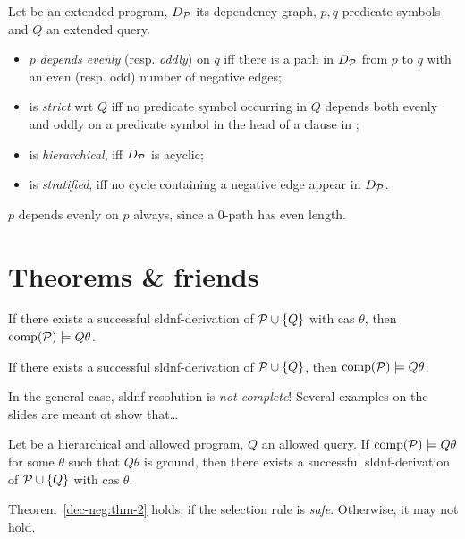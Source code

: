 \begin{dfn}
    Let \prog be an extended program, \(D_\mathcal{P}\) its dependency graph, \(p,q\) predicate symbols and \(Q\) an extended query.
    \begin{itemize}
        \item \(p\) \emph{depends evenly} (resp. \emph{oddly}) on \(q\) iff there is a path in \(D_\mathcal{P}\) from \(p\) to \(q\) with an even (resp. odd) number of negative edges;
        \item \prog is \emph{strict} wrt \(Q\) iff no predicate symbol occurring in \(Q\) depends both evenly and oddly on a predicate symbol in the head of a clause in \prog;
        \item \prog is \emph{hierarchical}, iff \(D_\mathcal{P}\) is acyclic;
        \item \prog is \emph{stratified}, iff no cycle containing a negative edge appear in \(D_\mathcal{P}\).
    \end{itemize}
\end{dfn}

\begin{rem}
    \(p\) depends evenly on \(p\) always, since a \(0\)-path has even length.
\end{rem}

\section{Theorems \& friends}

\begin{thm}
    \label{dec-neg:thm-1}
    If there exists a successful \gls{sldnf}-derivation of \(\mathcal{P} \cup \lbrace Q \rbrace\) with \gls{cas} \(\theta\), then \(\operatorname{comp}(\mathcal{P}) \models Q\theta\).
\end{thm}

\begin{cor}
    If there exists a successful \gls{sldnf}-derivation of \(\mathcal{P} \cup \lbrace Q \rbrace\), then \(\operatorname{comp}(\mathcal{P}) \models Q\theta\).
\end{cor}

\begin{rem}
    In the general case, \gls{sldnf}-resolution is \emph{not complete}!
    Several examples on the slides are meant ot show that\ldots
\end{rem}

\begin{thm}
    \label{dec-neg:thm-2}
    Let \prog be a hierarchical and allowed program, \(Q\) an allowed query.
    If \(\operatorname{comp}(\mathcal{P}) \models Q\theta\) for some \(\theta\) such that \(Q\theta\) is ground, then there exists  a successful \gls{sldnf}-derivation of \(\mathcal{P} \cup \lbrace Q \rbrace\) with \gls{cas} \(\theta\).
\end{thm}

\begin{rem}
    Theorem~\ref{dec-neg:thm-2} holds, if the selection rule is \emph{safe}. Otherwise, it may not hold.
\end{rem}

